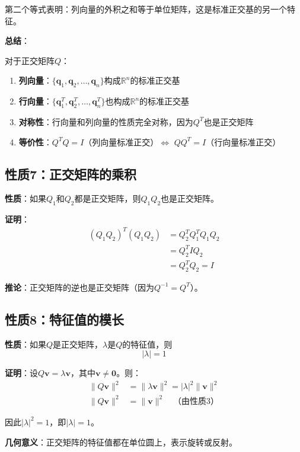 \documentclass[12pt,a4paper]{article}
\begin{document}
第二个等式表明：列向量的外积之和等于单位矩阵，这是标准正交基的另一个特征。

\textbf{总结}：

对于正交矩阵$Q$：
\begin{enumerate}
\item \textbf{列向量}：$\{\bm{q}_1, \bm{q}_2, \ldots, \bm{q}_n\}$构成$\mathbb{R}^n$的标准正交基
\item \textbf{行向量}：$\{\bm{q}_1^T, \bm{q}_2^T, \ldots, \bm{q}_n^T\}$也构成$\mathbb{R}^n$的标准正交基
\item \textbf{对称性}：行向量和列向量的性质完全对称，因为$Q^T$也是正交矩阵
\item \textbf{等价性}：$Q^T Q = I$（列向量标准正交）$\Longleftrightarrow$ $Q Q^T = I$（行向量标准正交）
\end{enumerate}

\subsection{性质7：正交矩阵的乘积}

\textbf{性质}：如果$Q_1$和$Q_2$都是正交矩阵，则$Q_1 Q_2$也是正交矩阵。

\textbf{证明}：
\begin{align}
(Q_1 Q_2)^T (Q_1 Q_2) &= Q_2^T Q_1^T Q_1 Q_2 \\
&= Q_2^T I Q_2 \\
&= Q_2^T Q_2 = I
\end{align}

\textbf{推论}：正交矩阵的逆也是正交矩阵（因为$Q^{-1} = Q^T$）。

\subsection{性质8：特征值的模长}

\textbf{性质}：如果$Q$是正交矩阵，$\lambda$是$Q$的特征值，则
\begin{equation}
|\lambda| = 1
\end{equation}

\textbf{证明}：设$Q\bm{v} = \lambda \bm{v}$，其中$\bm{v} \neq \bm{0}$。则：
\begin{align}
\|Q\bm{v}\|^2 &= \|\lambda \bm{v}\|^2 = |\lambda|^2 \|\bm{v}\|^2 \\
\|Q\bm{v}\|^2 &= \|\bm{v}\|^2 \quad \text{（由性质3）}
\end{align}

因此$|\lambda|^2 = 1$，即$|\lambda| = 1$。

\textbf{几何意义}：正交矩阵的特征值都在单位圆上，表示旋转或反射。
\end{document}
